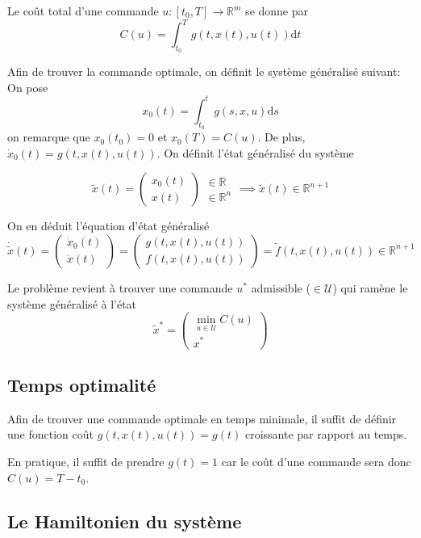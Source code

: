 \documentclass[
  french,
]{article}
\begin{document}
Le coût total d'une commande \(u:[t_0,T]\rightarrow\mathbb{R}^m\) se donne par
\[ C(u) = \int_{t_0}^T g(t, x(t), u(t)) \mathrm{d}t\]

Afin de trouver la commande optimale, on définit le système généralisé suivant:
On pose \[x_0(t)=\int_{t_0}^t g(s, x, u) \mathrm{d}s\]
on remarque que \(x_0(t_0)=0\) et \(x_0(T)=C(u)\).
De plus, \(\dot{x}_0(t) = g(t, x(t), u(t))\). On définit l'état généralisé du système

\[\tilde{x}(t)=\begin{pmatrix}x_0(t)\\x(t)\end{pmatrix}\begin{matrix}\in\mathbb{R}~\\\in\mathbb{R}^n\end{matrix}
    \implies \tilde{x}(t)\in\mathbb{R}^{n+1}\]

On en déduit l'équation d'état généralisé
\[\dot{\tilde{x}}(t) = \begin{pmatrix}\dot{x}_0(t)\\\dot{x}(t)\end{pmatrix}=
    \begin{pmatrix}g(t, x(t), u(t))\\f(t, x(t), u(t))\end{pmatrix}=
    \tilde{f}(t, x(t), u(t))\in\mathbb{R}^{n+1}\]

Le problème revient à trouver une commande \(u^*\) admissible
(\(\in\mathcal{U}\)) qui ramène le système généralisé à l'état
\[\tilde{x}^*=\begin{pmatrix}\min\limits_{u\in\mathcal{U}} C(u)\\ x^*\end{pmatrix}\]

\hypertarget{temps-optimalituxe9}{%
\subsection{Temps optimalité}\label{temps-optimalituxe9}}

Afin de trouver une commande optimale en temps minimale, il suffit de définir
une fonction coût \(g(t, x(t), u(t))=g(t)\) croissante par rapport au temps.

En pratique, il suffit de prendre \(g(t)=1\) car le coût d'une commande sera donc \(C(u)=T-t_0\).

\hypertarget{le-hamiltonien-du-systuxe8me}{%
\subsection{Le Hamiltonien du système}\label{le-hamiltonien-du-systuxe8me}}
\end{document}
